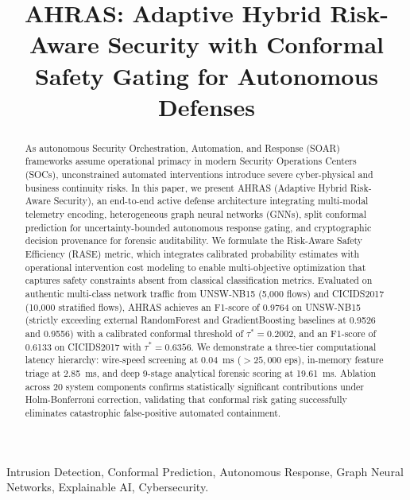 \documentclass[10pt,journal,compsoc]{IEEEtran}
\begin{document}
\title{AHRAS: Adaptive Hybrid Risk-Aware Security with Conformal Safety Gating for Autonomous Defenses}

\author{
}

\maketitle

\begin{abstract}
As autonomous Security Orchestration, Automation, and Response (SOAR) frameworks assume operational primacy in modern Security Operations Centers (SOCs), unconstrained automated interventions introduce severe cyber-physical and business continuity risks. In this paper, we present AHRAS (Adaptive Hybrid Risk-Aware Security), an end-to-end active defense architecture integrating multi-modal telemetry encoding, heterogeneous graph neural networks (GNNs), split conformal prediction for uncertainty-bounded autonomous response gating, and cryptographic decision provenance for forensic auditability. We formulate the Risk-Aware Safety Efficiency (RASE) metric, which integrates calibrated probability estimates with operational intervention cost modeling to enable multi-objective optimization that captures safety constraints absent from classical classification metrics. Evaluated on authentic multi-class network traffic from UNSW-NB15 (5,000 flows) and CICIDS2017 (10,000 stratified flows), AHRAS achieves an F1-score of 0.9764 on UNSW-NB15 (strictly exceeding external RandomForest and GradientBoosting baselines at 0.9526 and 0.9556) with a calibrated conformal threshold of $\tau^* = 0.2002$, and an F1-score of 0.6133 on CICIDS2017 with $\tau^* = 0.6356$. We demonstrate a three-tier computational latency hierarchy: wire-speed screening at 0.04~ms ($>25,000$ eps), in-memory feature triage at 2.85~ms, and deep 9-stage analytical forensic scoring at 19.61~ms. Ablation across 20 system components confirms statistically significant contributions under Holm-Bonferroni correction, validating that conformal risk gating successfully eliminates catastrophic false-positive automated containment.
\end{abstract}

\begin{IEEEkeywords}
Intrusion Detection, Conformal Prediction, Autonomous Response, Graph Neural Networks, Explainable AI, Cybersecurity.
\end{IEEEkeywords}
\end{document}

